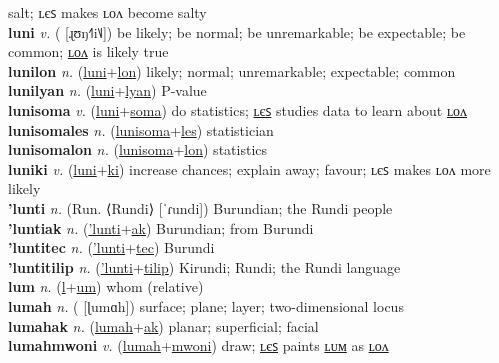 salt; ʟєꜱ makes ʟᴏᴧ become salty \label{lunaki} \\
\textbf{luni} \textit{v.} ( [ɻʊŋ˧˥i˥˩])
be likely; be normal; be unremarkable; be expectable; be common; \hyperref[lunilon]{ʟᴏᴧ} is likely true \label{luni} \\
\textbf{lunilon} \textit{n.} (\hyperref[luni]{luni}+\hyperref[lon]{lon})
likely; normal; unremarkable; expectable; common \label{lunilon} \\
\textbf{lunilyan} \textit{n.} (\hyperref[luni]{luni}+\hyperref[lyan]{lyan})
P-value \label{lunilyan} \\
\textbf{lunisoma} \textit{v.} (\hyperref[luni]{luni}+\hyperref[soma]{soma})
do statistics; \hyperref[lunisomales]{ʟєꜱ} studies data to learn about \hyperref[lunisomalon]{ʟᴏᴧ} \label{lunisoma} \\
\textbf{lunisomales} \textit{n.} (\hyperref[lunisoma]{lunisoma}+\hyperref[les]{les})
statistician \label{lunisomales} \\
\textbf{lunisomalon} \textit{n.} (\hyperref[lunisoma]{lunisoma}+\hyperref[lon]{lon})
statistics \label{lunisomalon} \\
\textbf{luniki} \textit{v.} (\hyperref[luni]{luni}+\hyperref[ki]{ki})
increase chances; explain away; favour; ʟєꜱ makes ʟᴏᴧ more likely \label{luniki} \\
\textbf{'lunti} \textit{n.} (Run. ⟨Rundi⟩ [ˈɾundi])
Burundian; the Rundi people \label{'lunti} \\
\textbf{'luntiak} \textit{n.} (\hyperref['lunti]{'lunti}+\hyperref[ak]{ak})
Burundian; from Burundi \label{'luntiak} \\
\textbf{'luntitec} \textit{n.} (\hyperref['lunti]{'lunti}+\hyperref[tec]{tec})
Burundi \label{'luntitec} \\
\textbf{'luntitilip} \textit{n.} (\hyperref['lunti]{'lunti}+\hyperref[tilip]{tilip})
Kirundi; Rundi; the Rundi language \label{'luntitilip} \\
\textbf{lum} \textit{n.} (\hyperref[l]{l}+\hyperref[um]{um})
whom (relative) \label{lum} \\
\textbf{lumah} \textit{n.} ( [ɭumɑh])
surface; plane; layer; two-dimensional locus \label{lumah} \\
\textbf{lumahak} \textit{n.} (\hyperref[lumah]{lumah}+\hyperref[ak]{ak})
planar; superficial; facial \label{lumahak} \\
\textbf{lumahmwoni} \textit{v.} (\hyperref[lumah]{lumah}+\hyperref[mwoni]{mwoni})
draw; \hyperref[lumahmwoniles]{ʟєꜱ} paints \hyperref[lumahmwonilum]{ʟᴜᴍ} as \hyperref[lumahmwonilon]{ʟᴏᴧ} \label{lumahmwoni} \\
